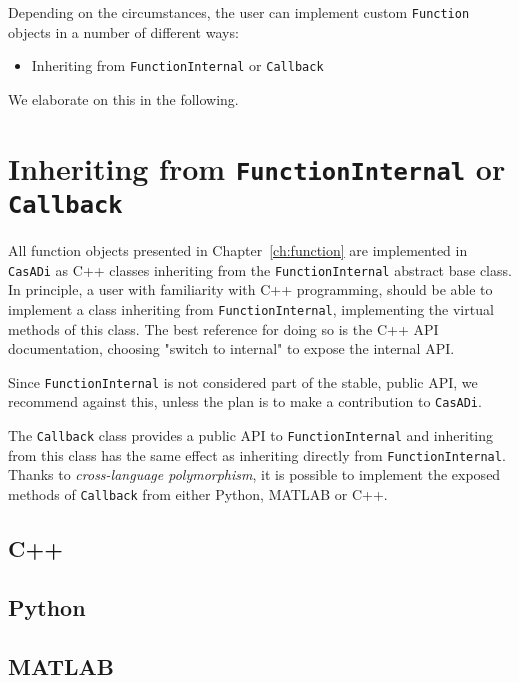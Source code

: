 \documentclass[a4paper,12pt]{book}
\newcommand{\CasADi}{\texttt{CasADi}\xspace}
\begin{document}
Depending on the circumstances, the user can implement custom \texttt{Function}
objects in a number of different ways:

\begin{itemize}
\item Inheriting from \texttt{FunctionInternal} or \texttt{Callback}
\end{itemize}

We elaborate on this in the following.
\section{Inheriting from \texttt{FunctionInternal} or \texttt{Callback}}
All function objects presented in Chapter~\ref{ch:function} are implemented
in \CasADi as C++ classes inheriting from the \texttt{FunctionInternal} abstract
base class. In principle, a user with familiarity with C++ programming, should
be able to implement a class inheriting from \texttt{FunctionInternal},
implementing the virtual methods of this class. The best reference for doing so
is the C++ API documentation, choosing "switch to internal" to expose the internal
API.

Since \texttt{FunctionInternal} is not considered part of the stable, public API,
we recommend against this, unless the plan is to make a contribution to \CasADi.

The \texttt{Callback} class provides a public API to \texttt{FunctionInternal}
and inheriting from this class has the same effect as inheriting directly from
\texttt{FunctionInternal}. Thanks to \emph{cross-language polymorphism}, it
is possible to implement the exposed methods of \texttt{Callback} from either
Python, MATLAB or C++.

\subsection*{C++}


\subsection*{Python}


\subsection*{MATLAB}
\end{document}
